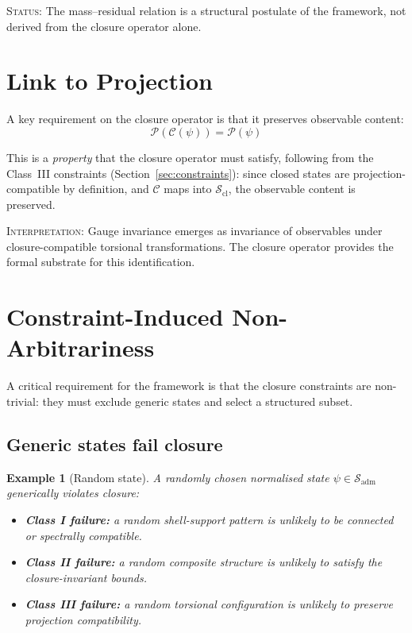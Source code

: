 \documentclass[12pt]{article}
\newtheorem{example}[theorem]{Example}
\newcommand{\Ccal}{\mathcal{C}}
\newcommand{\Pcal}{\mathcal{P}}
\newcommand{\Sadm}{\mathcal{S}_{\mathrm{adm}}}
\newcommand{\Scl}{\mathcal{S}_{\mathrm{cl}}}
\begin{document}
\textsc{Status:} The mass--residual relation is a structural postulate of the framework, not derived from the closure operator alone.

\section{Link to Projection}\label{sec:projection}

A key requirement on the closure operator is that it preserves observable content:
\begin{equation}\label{eq:projcompat}
    \Pcal(\Ccal(\psi)) = \Pcal(\psi)
\end{equation}

This is a \textit{property} that the closure operator must satisfy, following from the Class~III constraints (Section~\ref{sec:constraints}): since closed states are projection-compatible by definition, and $\Ccal$ maps into $\Scl$, the observable content is preserved.

\textsc{Interpretation:} Gauge invariance emerges as invariance of observables under closure-compatible torsional transformations. The closure operator provides the formal substrate for this identification.

\section{Constraint-Induced Non-Arbitrariness}\label{sec:nonarbitrary}

A critical requirement for the framework is that the closure constraints are non-trivial: they must exclude generic states and select a structured subset.

\subsection{Generic states fail closure}

\begin{example}[Random state]\label{ex:random}
A randomly chosen normalised state $\psi \in \Sadm$ generically violates closure:
\begin{itemize}
    \item \textbf{Class I failure:} a random shell-support pattern is unlikely to be connected or spectrally compatible.
    \item \textbf{Class II failure:} a random composite structure is unlikely to satisfy the closure-invariant bounds.
    \item \textbf{Class III failure:} a random torsional configuration is unlikely to preserve projection compatibility.
\end{itemize}
\end{example}
\end{document}
